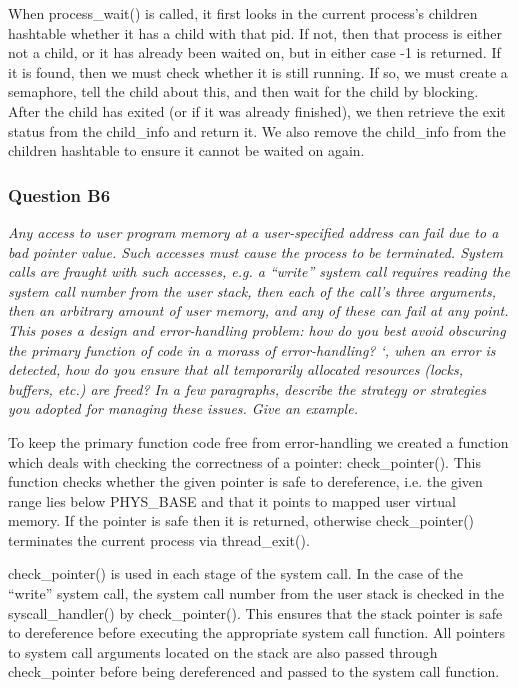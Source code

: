 When process\_wait() is called, it first looks in the current process's children hashtable whether it has a child with that pid. If not, then that process is either not a child, or it has already been waited on, but in either case -1 is returned. If it is found, then we must check whether it is still running. If so, we must create a semaphore, tell the child about this, and then wait for the child by blocking. After the child has exited (or if it was already finished), we then retrieve the exit status from the child\_info and return it. We also remove the child\_info from the children hashtable to ensure it cannot be waited on again.

\subsubsection*{Question B6} %
\textit{Any access to user program memory at a user-specified address can fail due to a bad pointer value.  Such accesses must cause the process to be terminated.  System calls are fraught with such accesses, e.g. a ``write'' system call requires reading the system call number from the user stack, then each of the call's three arguments, then an arbitrary amount of user memory, and any of these can fail at any point.  This poses a design and error-handling problem: how do you best avoid obscuring the primary function of code in a morass of error-handling?  `, when an error is detected, how do you ensure that all temporarily allocated resources (locks, buffers, etc.) are freed?  In a few paragraphs, describe the strategy or strategies you adopted for managing these issues.  Give an example.}

To keep the primary function code free from error-handling we created a function which deals with checking the correctness of a pointer: check\_pointer(). This function checks whether the given pointer is safe to dereference, i.e. the given range lies below PHYS\_BASE and that it points to mapped user virtual memory. If the pointer is safe then it is returned, otherwise check\_pointer() terminates the current process via thread\_exit().

check\_pointer() is used in each stage of the system call. In the case of the ``write'' system call, the system call number from the user stack is checked in the syscall\_handler() by check\_pointer(). This ensures that the stack pointer is safe to dereference before executing the appropriate system call function. All pointers to system call arguments located on the stack are also passed through check\_pointer before being dereferenced and passed to the system call function.

